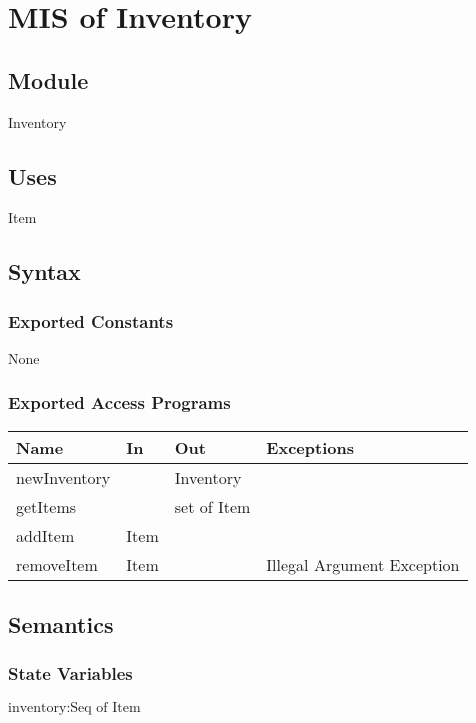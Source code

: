\documentclass[12pt, titlepage]{article}
\begin{document}
\newpage

\section{MIS of Inventory} 


\subsection{Module}
Inventory

\subsection{Uses}
Item


\subsection{Syntax}

\subsubsection{Exported Constants}
None

\subsubsection{Exported Access Programs}

\begin{center}
\begin{tabular}{p{2cm} p{4cm} p{4cm} p{2cm}}
\hline
\textbf{Name} & \textbf{In} & \textbf{Out} & \textbf{Exceptions} \\
\hline
newInventory & & Inventory \\
\hline
getItems &  & set of Item & \\
\hline
addItem & Item &  & \\
\hline
removeItem & Item & & Illegal Argument Exception\\
\hline
\end{tabular}
\end{center}

\subsection{Semantics}

\subsubsection{State Variables}
$\text{inventory}: \text{Seq of Item}$\\
\end{document}
